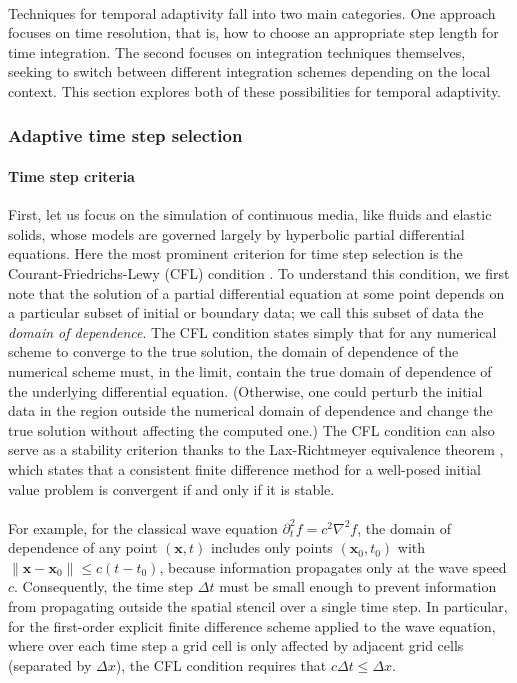\paragraph*{}
Techniques for temporal adaptivity fall into two main categories.
One approach focuses on time resolution, that is, how to choose an appropriate step length for time integration.
The second focuses on integration techniques themselves, seeking to switch between different integration schemes depending on the local context. This section explores both of these possibilities for temporal adaptivity.

\subsubsection{Adaptive time step selection}

\paragraph*{Time step criteria}
First, let us focus on the simulation of continuous media, like fluids and elastic solids, whose models are governed largely by hyperbolic partial differential equations.
Here the most prominent criterion for time step selection is the Courant-Friedrichs-Lewy (CFL) condition \cite{Courant1928}.
To understand this condition, we first note that the solution of a partial differential equation at some point depends on a particular subset of initial or boundary data; we call this subset of data the \emph{domain of dependence}.
The CFL condition states simply that for any numerical scheme to converge to the true solution, the domain of dependence of the numerical scheme must, in the limit, contain the true domain of dependence of the underlying differential equation.
(Otherwise, one could perturb the initial data in the region outside the numerical domain of dependence and change the true solution without affecting the computed one.)
The CFL condition can also serve as a stability criterion thanks to the Lax-Richtmeyer equivalence theorem \cite{Lax1956,Strikwerda2004}, which states that a consistent finite difference method for a well-posed initial value problem is convergent if and only if it is stable.
\paragraph*{}
For example, for the classical wave equation $\partial_t^2 f = c^2\nabla^2 f$, the domain of dependence of any point $(\mathbf x, t)$ includes only points $(\mathbf x_0, t_0)$ with $\|\mathbf x-\mathbf x_0\|\le c(t-t_0)$, because information propagates only at the wave speed $c$.
Consequently, the time step $\Delta t$ must be small enough to prevent information from propagating outside the spatial stencil over a single time step.
In particular, for the first-order explicit finite difference scheme applied to the wave equation, where over each time step a grid cell is only affected by adjacent grid cells (separated by $\Delta x$), the CFL condition requires that $c\Delta t \le \Delta x$.

